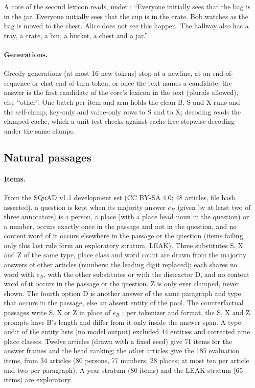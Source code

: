 \noindent A core of the second lexicon reads, under \fmtPost{}: ``Everyone initially sees that the bag is in the jar. Everyone initially sees that the cup is in the crate. Bob watches as the bag is moved to the chest. Alice does not see this happen. The hallway also has a tray, a crate, a bin, a bucket, a chest and a jar.''

\paragraph{Generations.} Greedy generations (at most 16 new tokens) stop at a newline, at an end-of-sequence or chat end-of-turn token, or once the text names a candidate; the answer is the first candidate of the core's lexicon in the text (plurals allowed), else ``other''. One batch per item and arm holds the clean B, S and X runs and the self-clamp, key-only and value-only rows to S and to X; decoding reads the clamped cache, which a unit test checks against cache-free stepwise decoding under the same clamps.

\subsection{Natural passages}\label{app:prompts-natural}

\paragraph{Items.} From the SQuAD v1.1 development set \citep{rajpurkar2016squad} (CC BY-SA 4.0; 48 articles, file hash asserted), a question is kept when its majority answer $e_B$ (given by at least two of three annotators) is a person, a place (with a place head noun in the question) or a number, occurs exactly once in the passage and not in the question, and no content word of it occurs elsewhere in the passage or the question (items failing only this last rule form an exploratory stratum, LEAK). Three substitutes S, X and Z of the same type, place class and word count are drawn from the majority answers of other articles (numbers: the leading digit replaced); each shares no word with $e_B$, with the other substitutes or with the distractor D, and no content word of it occurs in the passage or the question. Z is only ever clamped, never shown. The fourth option D is another answer of the same paragraph and type that occurs in the passage, else an absent entity of the pool. The counterfactual passages write S, X or Z in place of $e_B$ \citep{longpre2021conflicts}; per tokenizer and format, the S, X and Z prompts have B's length and differ from it only inside the answer span. A type audit of the entity lists (no model output) excluded 44 entities and corrected nine place classes. Twelve articles (drawn with a fixed seed) give 71 items for the answer frames and the head ranking; the other articles give the 185 evaluation items, from 34 articles (80 persons, 77 numbers, 28 places; at most ten per article and two per paragraph). A year stratum (80 items) and the LEAK stratum (65 items) are exploratory. %

